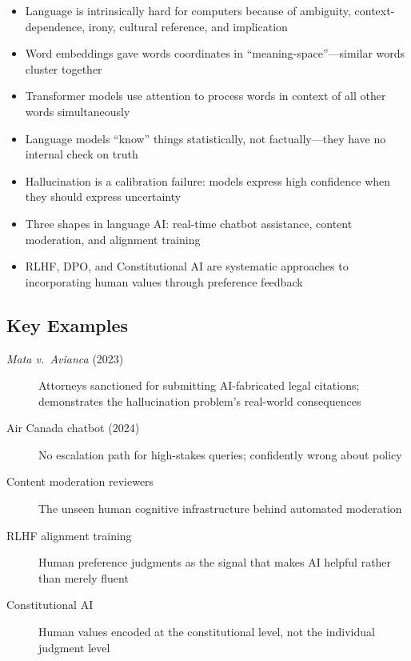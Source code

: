 \begin{keyconcept}
\begin{itemize}
    \item Language is intrinsically hard for computers because of ambiguity, context-dependence, irony, cultural reference, and implication
    \item Word embeddings gave words coordinates in ``meaning-space''---similar words cluster together
    \item Transformer models use attention to process words in context of all other words simultaneously
    \item Language models ``know'' things statistically, not factually---they have no internal check on truth
    \item Hallucination is a calibration failure: models express high confidence when they should express uncertainty
    \item Three \hitl shapes in language AI: real-time chatbot assistance, content moderation, and alignment training
    \item RLHF, DPO, and Constitutional AI are systematic approaches to incorporating human values through preference feedback
\end{itemize}
\end{keyconcept}

\subsection*{Key Examples}

\begin{description}
    \item[\emph{Mata v.\ Avianca} (2023)] Attorneys sanctioned for submitting AI-fabricated legal citations; demonstrates the hallucination problem's real-world consequences
    \item[Air Canada chatbot (2024)] No escalation path for high-stakes queries; confidently wrong about policy
    \item[Content moderation reviewers] The unseen human cognitive infrastructure behind automated moderation
    \item[RLHF alignment training] Human preference judgments as the signal that makes AI helpful rather than merely fluent
    \item[Constitutional AI] Human values encoded at the constitutional level, not the individual judgment level
\end{description}

